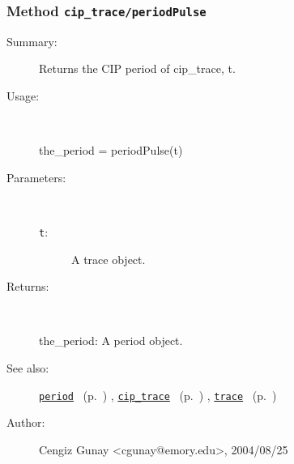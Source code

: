\subsubsection[Method \texttt{periodPulse}]{Method \texttt{cip\_trace/periodPulse}}%
%
\label{ref_cip_trace__periodPulse}%
\hypertarget{ref_cip_trace__periodPulse}{}%
\begin{description}
\item[Summary:]Returns the CIP period of cip\_trace, t. 
%
\item[Usage:]~%
\begin{lyxcode}%
the\_period = periodPulse(t)
%
\end{lyxcode}%
%
%
\item[Parameters:]~
\begin{description}%
\item[\texttt{t}:]
 A trace object.
\end{description}%
%
\item[Returns:
]~

	the\_period: A period object.
%
%
\item[See also:]%
\hyperlink{ref_period}{\texttt{period}}%
\ (p.~\pageref{ref_period})%
%
, \hyperlink{ref_cip_trace}{\texttt{cip\_trace}}%
\ (p.~\pageref{ref_cip_trace})%
%
, \hyperlink{ref_trace}{\texttt{trace}}%
\ (p.~\pageref{ref_trace})%
%
%
\item[Author:]%
Cengiz Gunay <cgunay@emory.edu>, 2004/08/25
%
\end{description}
\methodline%
